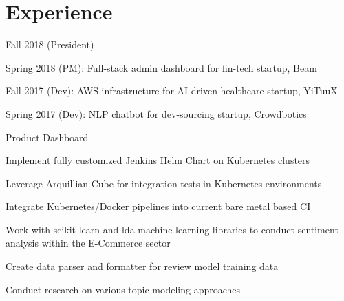 \documentclass[]{deedy-resume}
\begin{document}
\begin{minipage}[t]{0.66\textwidth}


\section{Experience}
\sectionsep{}
\begin{tightemize}
  \item Fall 2018 (President)
  \item Spring 2018 (PM): Full-stack admin dashboard for fin-tech startup, Beam
  \item Fall 2017 (Dev): AWS infrastructure for AI-driven healthcare startup, YiTuuX
  \item Spring 2017 (Dev): NLP chatbot for dev-sourcing startup, Crowdbotics
\end{tightemize}
\sectionsep{}

\begin{tightemize}
  \item Product Dashboard 
\end{tightemize}

\sectionsep{}
\begin{tightemize}
  \item Implement fully customized Jenkins Helm Chart on Kubernetes clusters
  \item Leverage Arquillian Cube for integration tests in Kubernetes environments
  \item Integrate Kubernetes/Docker pipelines into current bare metal based CI
\end{tightemize}
\sectionsep{}

\begin{tightemize}
  \item Work with scikit-learn and lda machine learning libraries to conduct sentiment analysis within the E-Commerce sector
  \item Create data parser and formatter for review model training data
  \item Conduct research on various topic-modeling approaches
\end{tightemize}
\sectionsep{}


\end{minipage}
\end{document}
